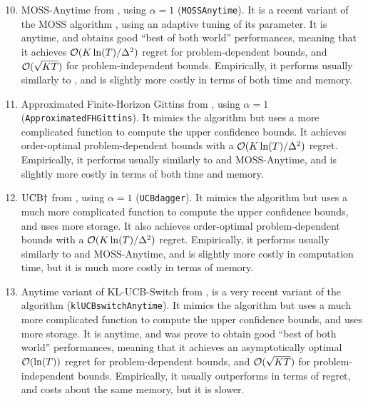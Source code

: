 \begin{enumerate}
    \setcounter{enumi}{9}
    \item
    $\mathrm{MOSS}$-$\mathrm{Anytime}$ from \cite{Degenne16}, using $\alpha=1$ (\texttt{MOSSAnytime}).
    It is a recent variant of the $\mathrm{MOSS}$ algorithm \cite{BubeckSlivkins12}, using an adaptive tuning of its parameter. It is anytime, and obtains good ``best of both world'' performances, meaning that it achieves $\mathcal{O}(K\ln(T)/\Delta^2)$ regret for problem-dependent bounds, and $\mathcal{O}(\sqrt{KT})$ for problem-independent bounds.
    Empirically, it performs usually similarly to \UCB, and is slightly more costly in terms of both time and memory.

    \item
    Approximated Finite-Horizon Gittins from \cite{Lattimore16a}, using $\alpha=1$ (\texttt{ApproximatedFHGittins}).
    It mimics the \UCB{} algorithm but uses a more complicated function to compute the upper confidence bounds.
    It achieves order-optimal problem-dependent bounds with a $\mathcal{O}(K\ln(T)/\Delta^2)$ regret.
    Empirically, it performs usually similarly to \UCB{} and $\mathrm{MOSS}$-$\mathrm{Anytime}$, and is slightly more costly in terms of both time and memory.

    \item
    $\mathrm{UCB}\dagger$ from \cite{Lattimore2018refining}, using $\alpha=1$ (\texttt{UCBdagger}).
    It mimics the \UCB{} algorithm but uses a much more complicated function to compute the upper confidence bounds, and uses more storage.
    It also achieves order-optimal problem-dependent bounds with a $\mathcal{O}(K\ln(T)/\Delta^2)$ regret.
    Empirically, it performs usually similarly to \UCB{} and $\mathrm{MOSS}$-$\mathrm{Anytime}$, and is slightly more costly in computation time, but it is much more costly in terms of memory.

    \item
    Anytime variant of KL-UCB-Switch from \cite{GarivierHadiji2018},
    is a very recent variant of the \klUCB{} algorithm \cite{KLUCBJournal}
    (\texttt{klUCBswitchAnytime}).
    It mimics the \klUCB{} algorithm but uses a much more complicated function to compute the upper confidence bounds, and uses more storage.
    It is anytime, and was prove to obtain good ``best of both world'' performances, meaning that it achieves an asymptotically optimal $\mathcal{O}(\ln(T))$ regret for problem-dependent bounds, and $\mathcal{O}(\sqrt{KT})$ for problem-independent bounds.
    Empirically, it usually outperforms \klUCB{} in terms of regret, and costs about the same memory, but it is slower.


\end{enumerate}
